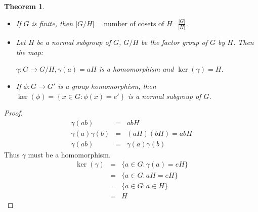 \documentclass{article}
\theoremstyle{MyNonumberplain}
\theoremstyle{break}
\newtheorem*{proof}{Proof. }
\newcommand{\p}{\phi}
\theoremstyle{break}
\newtheorem{theorem}{Theorem}[section]
\theoremstyle{break}
\theoremstyle{definition}
\theoremstyle{break}
\begin{document}
\begin{thmbox}
    \begin{theorem}
        \begin{itemize}
            \item If $G$ is finite, then $| G / H | = \text{number of cosets of $H$=}
            \frac{| G |}{| H |}$.\bigskip
            
            \item Let $H$ be a normal subgroup of $G$, $G / H$ be the factor group of
            $G$ by $H$. Then the map:\bigskip
            
            $\gamma : G \rightarrow G / H, \gamma (a) = a H$ is a homomorphism and $\ker
            (\gamma) = H$.\bigskip
            
            \item If $\p : G \rightarrow G'$ is a group homomorphism, then $\ker \left(
            \p \right) = \left\{ x \in G : \p (x) = e' \right\}$ is a normal subgroup of
            $G$.
          \end{itemize}
    \end{theorem}
    \begin{prfbox}
        \begin{proof}
            \begin{eqnarray*}
                \gamma (a b) & = & a b H\\
                \gamma (a) \gamma (b) & = & (a H) (b H) = a b H\\
                \gamma (a b) & = & \gamma (a) \gamma (b)
              \end{eqnarray*}
              Thus $\gamma$ must be a homomorphism.
              \begin{eqnarray*}
                \ker (\gamma) & = & \{ a \in G : \gamma (a) = e H \}\\
                & = & \{ a \in G : a H = e H \}\\
                & = & \{ a \in G : a \in H \}\\
                & = & H
              \end{eqnarray*}
        \end{proof}
    \end{prfbox}
\end{thmbox}
\end{document}
